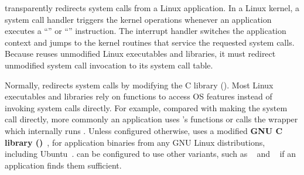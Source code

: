 \label{sec:libos:syscall-redirection}


\thelibos{} transparently redirects system calls from a Linux application. In a Linux kernel, a system call handler
triggers the kernel operations
whenever an application executes
a ``'' or ``'' instruction.
The interrupt handler
switches the application context
and jumps to the kernel routines that service the requested system calls.
Because \thelibos{} reuses
unmodified Linux executables and libraries,
it must redirect
unmodified system call invocation
to its
system call table. %


Normally,
\thelibos{} redirects system calls %
by modifying the C library (\libc{}).
Most Linux executables and libraries
rely on \libc{} functions to access OS features
instead of
invoking system calls directly.
For example,
compared with making the  system call directly,
more commonly
an application uses \libc{}'s  functions
or calls the \libc{}  wrapper
which internally runs .
Unless configured otherwise, \thelibos{} uses a modified
{\bf GNU C library (\glibc{})}~\cite{glibc},
for application binaries from any GNU Linux distributions, including Ubuntu~\cite{ubuntu-packages}.
\graphene{} can be configured to use other \libc{} variants,
such as ~\cite{uclibc} and ~\cite{musl}
if an application finds them sufficient.




